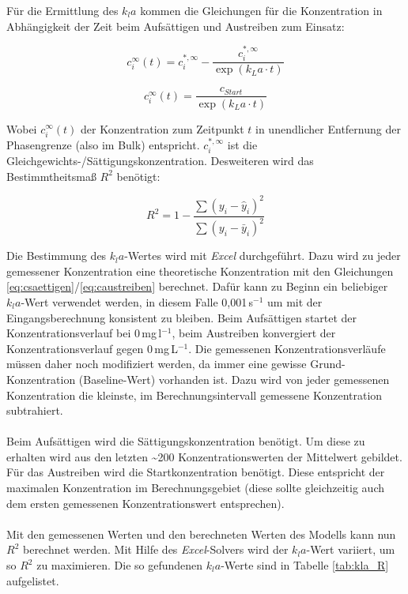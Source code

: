 \documentclass[12pt,liststotoc]{report}
\begin{document}
Für die Ermittlung des $k_la$ kommen die Gleichungen für die Konzentration in Abhängigkeit der Zeit beim Aufsättigen und Austreiben zum Einsatz:

\begin{equation}
\label{eq:csaettigen}
    c_i^\infty(t) = c_i^{*,\infty} - \frac{c_i^{*,\infty}}{\exp\left(k_La \cdot t\right)}
\end{equation}

\begin{equation}
\label{eq:caustreiben}
    c_i^\infty(t) = \frac{c_{Start}}{\exp\left(k_La \cdot t\right)}
\end{equation}

Wobei $c_i^\infty(t)$ der Konzentration zum Zeitpunkt $t$ in unendlicher Entfernung der Phasengrenze (also im Bulk) entspricht. $c_i^{*,\infty}$ ist die Gleichgewichts-/Sättigungskonzentration.
Desweiteren wird das Bestimmtheitsmaß $R^2$ benötigt:

\begin{equation}
    R^2 = 1 - \frac{\sum\left(y_i-\hat{y}_i\right)^2}{\sum\left(y_i-\bar{y}_i\right)^2}
\end{equation}

Die Bestimmung des $k_la$-Wertes wird mit \textit{Excel} durchgeführt. Dazu wird zu jeder gemessener Konzentration eine theoretische Konzentration mit den Gleichungen \ref{eq:csaettigen}/\ref{eq:caustreiben} berechnet. Dafür kann zu Beginn ein beliebiger $k_la$-Wert verwendet werden, in diesem Falle 0,001\,s$^{-1}$ um mit der Eingangsberechnung konsistent zu bleiben. Beim Aufsättigen startet der Konzentrationsverlauf bei 0\,mg\,l$^{-1}$, beim Austreiben konvergiert der Konzentrationsverlauf gegen 0\,mg\,L$^{-1}$. Die gemessenen Konzentrationsverläufe müssen daher noch modifiziert werden, da immer eine gewisse Grund-Konzentration (Baseline-Wert) vorhanden ist. Dazu wird von jeder gemessenen Konzentration die kleinste, im Berechnungsintervall gemessene Konzentration subtrahiert.\\
\\
Beim Aufsättigen wird die Sättigungskonzentration benötigt. Um diese zu erhalten wird aus den letzten \textasciitilde 200 Konzentrationswerten der Mittelwert gebildet. Für das Austreiben wird die Startkonzentration benötigt. Diese entspricht der maximalen Konzentration im Berechnungsgebiet (diese sollte gleichzeitig auch dem ersten gemessenen Konzentrationswert entsprechen).\\
\\
Mit den gemessenen Werten und den berechneten Werten des Modells kann nun $R^2$ berechnet werden. Mit Hilfe des \textit{\textit{Excel}}-Solvers wird der $k_la$-Wert variiert, um so $R^2$ zu maximieren. Die so gefundenen $k_la$-Werte sind in Tabelle \ref{tab:kla_R} aufgelistet.
\end{document}
